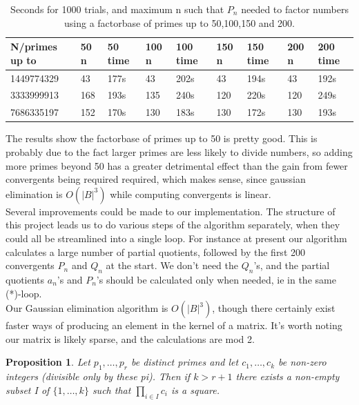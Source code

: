 \documentclass[10pt,a4paper]{report}
\newtheorem*{prop}{Proposition}
\begin{document}
\begin{table}[h]
\centering
\begin{tabular}{|l|l|l|l|l|l|l|l|l|}
\hline
N/primes up to & 50 n & 50 time & 100 n & 100 time & 150 n & 150 time & 200 n & 200 time \\ \hline
1449774329     & 43   & 177s    & 43    & 202s     & 43    & 194s     & 43    & 192s     \\ \hline
3333999913     & 168  & 193s    & 135   & 240s     & 120   & 220s     & 120   & 249s     \\ \hline
7686335197     & 152  & 170s    & 130   & 183s     & 130   & 172s     & 130   & 193s     \\ \hline
\end{tabular}
\caption{Seconds for 1000 trials, and maximum n such that $P_n$ needed to factor numbers using a factorbase of primes up to 50,100,150 and 200.}
\end{table}


The results show the factorbase of primes up to 50 is pretty good. This is probably due to the fact larger primes are less likely to divide numbers, so adding more primes beyond 50 has a greater detrimental effect than the gain from fewer convergents being required required, which makes sense, since gaussian elimination is $O(|B|^3)$ while computing convergents is linear. \\

Several improvements could be made to our implementation. The structure of this project leads us to do various steps of the algorithm separately, when they could all be streamlined into a single loop. For instance at present our algorithm calculates a large number of partial quotients, followed by the first 200 convergents $P_n$ and $Q_n$ at the start. We don't need the $Q_n$'s, and the partial quotients $a_n$'s and $P_n$'s should be calculated only when needed, ie in the same (*)-loop. \\

Our Gaussian elimination algorithm is $O(|B|^3)$, though there certainly exist faster ways of producing an element in the kernel of a matrix. It's worth noting our matrix is likely sparse, and the calculations are mod 2.\\ 

\begin{prop}
Let $p_1,\dots, p_r$ be distinct primes and let $c_1, \dots, c_k$ be non-zero integers (divisible only by these pi). Then if $k > r + 1$ there exists a non-empty subset I of $\{1,\dots, k\}$ such that $\prod_{i\in I} c_i$ is a square.
\end{prop}
\end{document}

